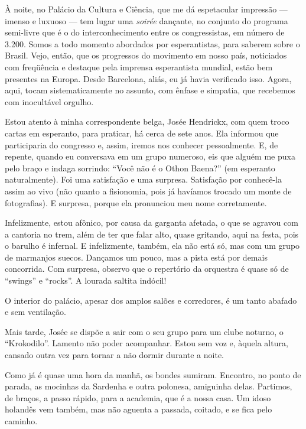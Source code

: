 À noite, no Palácio da Cultura e Ciência, que me dá espetacular impressão --- imenso e luxuoso --- tem lugar uma \textit{soirée} dançante, no conjunto do programa semi-livre que é o do interconhecimento entre os congressistas, em número de 3.200. Somos a todo momento abordados por esperantistas, para saberem sobre o Brasil. Vejo, então, que os progressos do movimento em nosso país, noticiados com freqüência e destaque pela imprensa esperantista mundial, estão bem presentes na Europa. Desde Barcelona, aliás, eu já havia verificado isso. Agora, aqui, tocam sistematicamente no assunto, com ênfase e simpatia, que recebemos com inocultável orgulho.

Estou atento à minha correspondente belga, Josée Hendrickx, com quem troco cartas em esperanto, para praticar, há cerca de sete anos. Ela informou que participaria do congresso e, assim, iremos nos conhecer pessoalmente. E, de repente, quando eu conversava em um grupo numeroso, eis que alguém me puxa pelo braço e indaga sorrindo: ``Você não é o Othon Baena?'' (em esperanto naturalmente). Foi uma satisfação e uma surpresa. Satisfação por conhecê-la assim ao vivo (não quanto a fisionomia, pois já havíamos trocado um monte de fotografias). E surpresa, porque ela pronunciou meu nome corretamente.

Infelizmente, estou afônico, por causa da garganta afetada, o que se agravou com a cantoria no trem, além de ter que falar alto, quase gritando, aqui na festa, pois o barulho é infernal. E infelizmente, também, ela não está só, mas com um grupo de marmanjos suecos. Dançamos um pouco, mas a pista está por demais concorrida. Com surpresa, observo que o repertório da orquestra é quase só de ``swings'' e ``rocks''. A lourada saltita indócil!

O interior do palácio, apesar dos amplos salões e corredores, é um tanto abafado e sem ventilação.

Mais tarde, Josée se dispõe a sair com o seu grupo para um clube noturno, o ``Krokodilo''. Lamento não poder acompanhar. Estou sem voz e, àquela altura, cansado outra vez para tornar a não dormir durante a noite.

Como já é quase uma hora da manhã, os bondes sumiram. Encontro, no ponto de parada, as mocinhas da Sardenha e outra polonesa, amiguinha delas. Partimos, de braços, a passo rápido, para a academia, que é a nossa casa. Um idoso holandês vem também, mas não aguenta a passada, coitado, e se fica pelo caminho.

